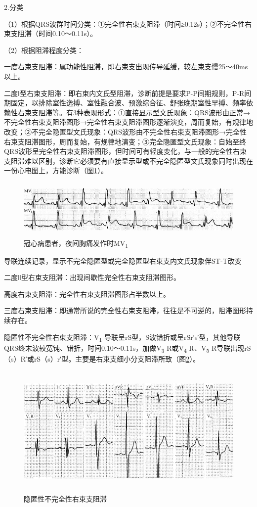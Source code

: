 2.分类

（1）根据QRS波群时间分类：①完全性右束支阻滞（时间≥0.12s）；②不完全性右束支阻滞（时间0.10～0.11s）。

（2）根据阻滞程度分类：

一度右束支阻滞：属功能性阻滞，即右束支出现传导延缓，较左束支慢25～40ms以上。

二度Ⅰ型右束支阻滞：即右束内文氏型阻滞，诊断前提是要求P-P间期规则，P-R间期固定，以排除室性逸搏、室性融合波、预激综合征、舒张晚期室性早搏、频率依赖性右束支阻滞等。有3种表现形式：①直接显示型文氏现象：QRS波形由正常→不完全性右束支阻滞图形→完全性右束支阻滞图形逐渐演变，周而复始，有规律地改变；②不完全隐匿型文氏现象：QRS波形由不完全性右束支阻滞图形→完全性右束支阻滞图形，周而复始，有规律地演变；③完全隐匿型文氏现象：自始至终QRS波形呈完全性右束支阻滞图形，但时间可有轻度变化，与一般的完全性右束支阻滞难以区别，诊断它必须要有直接显示型或不完全隐匿型文氏现象同时出现在一份心电图上，方能诊断（图\ref{fig21-5}）。

\begin{figure}[!htbp]
 \centering
 \includegraphics[width=5.58333in,height=1.125in]{./images/Image00353.jpg}
 \captionsetup{justification=centering}
 \caption{冠心病患者，夜间胸痛发作时MV\textsubscript{1}}
 \label{fig21-5}
  \end{figure} 
导联连续记录，显示不完全隐匿型或完全隐匿型右束支内文氏现象伴ST-T改变

二度Ⅱ型右束支阻滞：出现间歇性完全性右束支阻滞图形。

高度右束支阻滞：完全性右束支阻滞图形占半数以上。

三度右束支阻滞：即通常所说的完全性右束支阻滞，往往是不可逆的，阻滞图形持续存在。

隐匿性不完全性右束支阻滞：V\textsubscript{1}
导联呈rS型，S波错折或呈rSr′s′型，其他导联QRS终末波较宽钝、错折，时间0.10～0.11s，加做V\textsubscript{3}
R或V\textsubscript{4} R、V\textsubscript{5}
R导联出现rS（s）R′或rS（s）r′型。主要是右束支细小分支阻滞所致（图\ref{fig21-6}）。

\begin{figure}[!htbp]
 \centering
 \includegraphics[width=5.60417in,height=2.55208in]{./images/Image00354.jpg}
 \captionsetup{justification=centering}
 \caption{隐匿性不完全性右束支阻滞}
 \label{fig21-6}
  \end{figure} 

